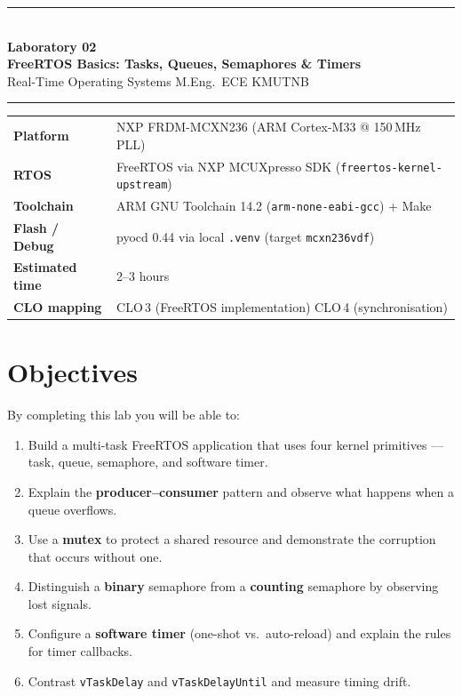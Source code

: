 \documentclass[11pt, a4paper]{article}
\newcommand{\api}[1]{\texttt{\small #1}}
\begin{document}
\begin{center}
  {\color{kmutnbBlue}\rule{\linewidth}{2pt}}\\[6pt]
  {\LARGE\bfseries\color{kmutnbBlue} Laboratory 02}\\[4pt]
  {\large\bfseries FreeRTOS Basics: Tasks, Queues, Semaphores \& Timers}\\[2pt]
  {\normalsize Real-Time Operating Systems \enspace\textbullet\enspace
   M.Eng.\ ECE \enspace\textbullet\enspace KMUTNB}\\[8pt]
  {\color{kmutnbGold}\rule{\linewidth}{1pt}}
\end{center}

\vspace{0.3cm}

\begin{tabular}{@{}p{3.8cm} p{10cm}@{}}
  \textbf{Platform}       & NXP FRDM-MCXN236 (ARM Cortex-M33 @ 150\,MHz PLL) \\[2pt]
  \textbf{RTOS}           & FreeRTOS via NXP MCUXpresso SDK (\texttt{freertos-kernel-upstream}) \\[2pt]
  \textbf{Toolchain}      & ARM GNU Toolchain 14.2 (\texttt{arm-none-eabi-gcc}) + Make \\[2pt]
  \textbf{Flash / Debug}  & pyocd 0.44 via local \texttt{.venv} (target \texttt{mcxn236vdf}) \\[2pt]
  \textbf{Estimated time} & 2--3 hours \\[2pt]
  \textbf{CLO mapping}    & CLO\,3 (FreeRTOS implementation) \enspace CLO\,4 (synchronisation) \\
\end{tabular}

\vspace{0.4cm}

\section{Objectives}

By completing this lab you will be able to:

\begin{enumerate}[noitemsep, leftmargin=*]
  \item Build a multi-task FreeRTOS application that uses four kernel primitives ---
        task, queue, semaphore, and software timer.
  \item Explain the \textbf{producer--consumer} pattern and observe what happens when
        a queue overflows.
  \item Use a \textbf{mutex} to protect a shared resource and demonstrate the
        corruption that occurs without one.
  \item Distinguish a \textbf{binary} semaphore from a \textbf{counting} semaphore by
        observing lost signals.
  \item Configure a \textbf{software timer} (one-shot vs.\ auto-reload) and explain the
        rules for timer callbacks.
  \item Contrast \api{vTaskDelay} and \api{vTaskDelayUntil} and measure timing drift.
\end{enumerate}
\end{document}
